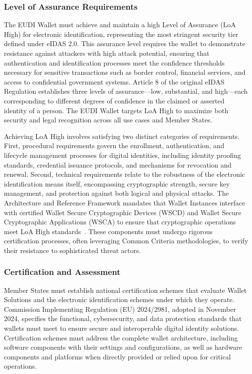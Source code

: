 \documentclass[sigconf,balance,nonacm,authordraft]{acmart}
\begin{document}
\subsubsection{Level of Assurance Requirements}

The EUDI Wallet must achieve and maintain a high Level of Assurance (LoA High) for electronic identification, representing the most stringent security tier defined under eIDAS 2.0. This assurance level requires the wallet to demonstrate resistance against attackers with high attack potential, ensuring that authentication and identification processes meet the confidence thresholds necessary for sensitive transactions such as border control, financial services, and access to confidential government systems. Article 8 of the original eIDAS Regulation establishes three levels of assurance—low, substantial, and high—each corresponding to different degrees of confidence in the claimed or asserted identity of a person. The EUDI Wallet targets LoA High to maximize both security and legal recognition across all use cases and Member States.

Achieving LoA High involves satisfying two distinct categories of requirements. First, procedural requirements govern the enrollment, authentication, and lifecycle management processes for digital identities, including identity proofing standards, credential issuance protocols, and mechanisms for revocation and renewal. Second, technical requirements relate to the robustness of the electronic identification means itself, encompassing cryptographic strength, secure key management, and protection against both logical and physical attacks. The Architecture and Reference Framework mandates that Wallet Instances interface with certified Wallet Secure Cryptographic Devices (WSCD) and Wallet Secure Cryptographic Applications (WSCA) to ensure that cryptographic operations meet LoA High standards~\cite{EU_ARF2024}. These components must undergo rigorous certification processes, often leveraging Common Criteria methodologies, to verify their resistance to sophisticated threat actors.

\subsubsection{Certification and Assessment}

Member States must establish national certification schemes that evaluate Wallet Solutions and the electronic identification schemes under which they operate. Commission Implementing Regulation (EU) 2024/2981, adopted in November 2024, specifies the functional, cybersecurity, and data protection standards that wallets must meet to ensure secure and interoperable digital identity solutions. Certification schemes must address the complete wallet architecture, including software components with their settings and configurations, as well as hardware components and platforms when directly provided or relied upon for critical operations.
\end{document}
